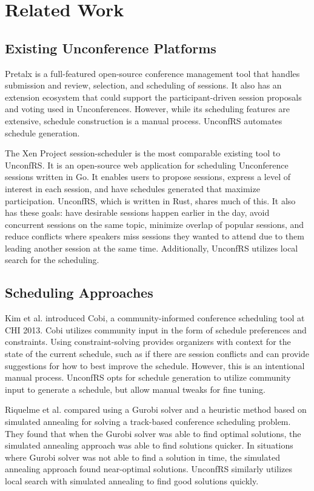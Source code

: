\chapter{Related Work}\label{ch:related Work}

\section{Existing Unconference Platforms}
Pretalx \cite{kunze2017} is a full-featured open-source conference management tool that handles submission and review, selection, and scheduling of sessions. It also has an extension ecosystem that could support the participant-driven session proposals and voting used in Unconferences. However, while its scheduling features are extensive, schedule construction is a manual process. UnconfRS automates schedule generation.

The Xen Project session-scheduler \cite{dunlap2018} is the most comparable existing tool to UnconfRS. It is an open-source web application for scheduling Unconference sessions written in Go. It enables users to propose sessions, express a level of interest in each session, and have schedules generated that maximize participation. UnconfRS, which is written in Rust, shares much of this. It also has these goals: have desirable sessions happen earlier in the day, avoid concurrent sessions on the same topic, minimize overlap of popular sessions, and reduce conflicts where speakers miss sessions they wanted to attend due to them leading another session at the same time. Additionally, UnconfRS utilizes local search for the scheduling.

\section{Scheduling Approaches}
Kim et al. \cite{kim2013} introduced Cobi, a community-informed conference scheduling tool at CHI 2013. Cobi utilizes community input in the form of schedule preferences and constraints. Using constraint-solving provides organizers with context for the state of the current schedule, such as if there are session conflicts and can provide suggestions for how to best improve the schedule. However, this is an intentional manual process. UnconfRS opts for schedule generation to utilize community input to generate a schedule, but allow manual tweaks for fine tuning. 

Riquelme et al. \cite{riquelme2022} compared using a Gurobi solver and a heuristic method based on simulated annealing for solving a track-based conference scheduling problem. They found that when the Gurobi solver was able to find optimal solutions, the simulated annealing approach was able to find solutions quicker. In situations where Gurobi solver was not able to find a solution in time, the simulated annealing approach found near-optimal solutions. UnconfRS similarly utilizes local search with simulated annealing to find good solutions quickly.


